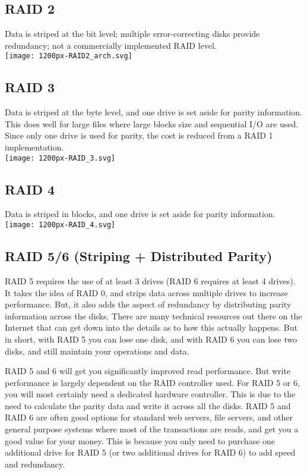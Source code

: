 \documentclass{article}
\begin{document}
\subsection{RAID 2}
Data is striped at the bit level; multiple error-correcting disks provide redundancy; not a commercially implemented RAID level.\\
\texttt{[image: 1200px-RAID2\_arch.svg]} 

\subsection{RAID 3}
Data is striped at the byte level, and one drive is set aside for parity information. This does well for large files where large blocks size and sequential I/O are used. Since only one drive is used for parity, the cost is reduced from a RAID 1 implementation.\\
\texttt{[image: 1200px-RAID\_3.svg]} 

\subsection{RAID 4}
Data is striped in blocks, and one drive is set aside for parity information.\\
\texttt{[image: 1200px-RAID\_4.svg]} 

\subsection{RAID 5/6 (Striping + Distributed Parity)}
RAID 5 requires the use of at least 3 drives (RAID 6 requires at least 4 drives). It takes the idea of RAID 0, and strips data across multiple drives to increase performance. But, it also adds the aspect of redundancy by distributing parity information across the disks. There are many technical resources out there on the Internet that can get down into the details as to how this actually happens. But in short, with RAID 5 you can lose one disk, and with RAID 6 you can lose two disks, and still maintain your operations and data.

RAID 5 and 6 will get you significantly improved read performance. But write performance is largely dependent on the RAID controller used. For RAID 5 or 6, you will most certainly need a dedicated hardware controller. This is due to the need to calculate the parity data and write it across all the disks. RAID 5 and RAID 6 are often good options for standard web servers, file servers, and other general purpose systems where most of the transactions are reads, and get you a good value for your money. This is because you only need to purchase one additional drive for RAID 5 (or two additional drives for RAID 6) to add speed and redundancy.
\end{document}
